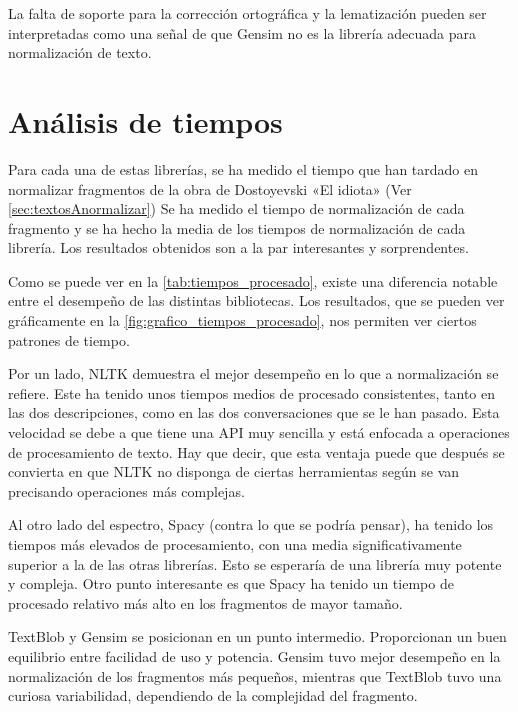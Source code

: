 \documentclass[a4paper,twocolumn]{article}
\begin{document}
    La falta de soporte para la corrección ortográfica y la lematización pueden ser interpretadas como una señal de que Gensim no es la librería adecuada para normalización de texto.


    \clearpage


    \section{Análisis de tiempos}\label{sec:analisis-de-tiempos}
    Para cada una de estas librerías, se ha medido el tiempo que han tardado en normalizar fragmentos de la obra de Dostoyevski «El idiota» (Ver \autoref{sec:textosAnormalizar})
    Se ha medido el tiempo de normalización de cada fragmento y se ha hecho la media de los tiempos de normalización de cada librería.
    Los resultados obtenidos son a la par interesantes y sorprendentes.

    Como se puede ver en la \autoref{tab:tiempos_procesado}, existe una diferencia notable entre el desempeño de las distintas bibliotecas.
    Los resultados, que se pueden ver gráficamente en la \autoref{fig:grafico_tiempos_procesado}, nos permiten ver ciertos patrones de tiempo.

    Por un lado, NLTK demuestra el mejor desempeño en lo que a normalización se refiere.
    Este ha tenido unos tiempos medios de procesado consistentes,
    tanto en las dos descripciones, como en las dos conversaciones que se le han pasado.
    Esta velocidad se debe a que tiene una API muy sencilla y está enfocada a operaciones de procesamiento de texto.
    Hay que decir, que esta ventaja puede que después se convierta en que NLTK no disponga de ciertas herramientas según se van precisando operaciones más complejas.

    Al otro lado del espectro, Spacy (contra lo que se podría pensar), ha tenido los tiempos más elevados de procesamiento,
    con una media significativamente superior a la de las otras librerías.
    Esto se esperaría de una librería muy potente y compleja.
    Otro punto interesante es que Spacy ha tenido un tiempo de procesado relativo más alto
    en los fragmentos de mayor tamaño.

    TextBlob y Gensim se posicionan en un punto intermedio.
    Proporcionan un buen equilibrio entre facilidad de uso y potencia.
    Gensim tuvo mejor desempeño en la normalización de los fragmentos más pequeños,
    mientras que TextBlob tuvo una curiosa variabilidad, dependiendo de la complejidad del fragmento.
\end{document}
